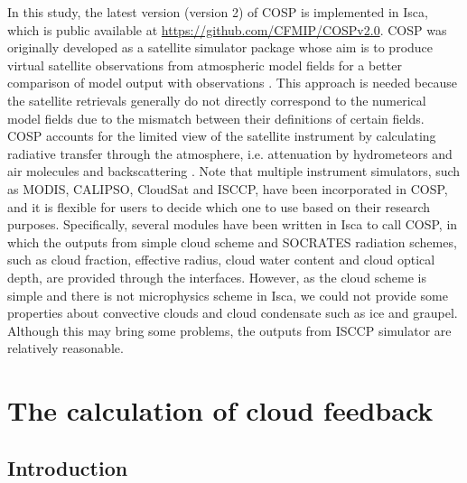 In this study, the latest version (version 2) of COSP  \citep{Swales2018} is implemented in Isca, which is public available at \url{https://github.com/CFMIP/COSPv2.0}. COSP was originally developed as a satellite simulator package whose aim is to produce virtual satellite observations from atmospheric model fields for a better comparison of model output with observations \citep{BodasSalcedo2011}. This approach is needed because the satellite retrievals generally do not directly correspond to the numerical model fields due to the mismatch between their definitions of certain fields. COSP accounts for the limited view of the satellite instrument by calculating radiative transfer through the atmosphere, i.e. attenuation by hydrometeors and air molecules and backscattering \citep{Kuma2020}. Note that multiple instrument simulators, such as MODIS, CALIPSO, CloudSat and ISCCP, have been incorporated in COSP, and it is flexible for users to decide which one to use based on their research purposes. Specifically, several modules have been written in Isca to call COSP, in which the outputs from simple cloud scheme and SOCRATES radiation schemes, such as cloud fraction, effective radius, cloud water content and cloud optical depth, are provided through the interfaces. However, as the cloud scheme is simple and there is not microphysics scheme in Isca, we could not provide some properties about convective clouds and cloud condensate such as ice and graupel. Although this may bring some problems, the outputs from ISCCP simulator are relatively reasonable.

\section{The calculation of cloud feedback}
\label{sec:method_cloud_fbk}

\subsection{Introduction}

